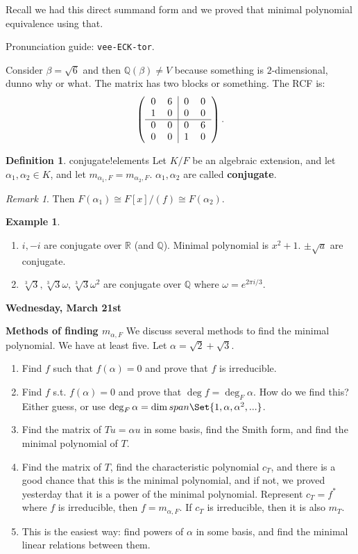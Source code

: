 \documentclass[9pt,reqno,twoside]{amsbook}
\theoremstyle{plain}
\numberwithin{section}{chapter}
\numberwithin{equation}{chapter}
\theoremstyle{definition}
\newtheorem{Def}[theorem]{Definition}
\newtheorem{Ex}[theorem]{Example}
\theoremstyle{remark}
\newtheorem{rem}[theorem]{Remark}
\theoremstyle{plain}
\newcommand{\R}{\mathbb{R}}
\newcommand{\Q}{\mathbb{Q}}
\newcommand{\bb}{\vspace{3mm}}
\newcommand{\lpar}{\left(}
\newcommand{\rpar}{\right)}
\begin{document}
Recall we had this direct summand form and we proved that minimal polynomial equivalence using that. 

Pronunciation guide:
\texttt{vee-ECK-tor}.

Consider $\beta = \sqrt{6}$ and then $\Q(\beta) \neq V$ because something is $2$-dimensional, dunno why or what. The matrix has two blocks or something. The RCF is:
$$
\lpar 
\begin{tabular}{cc|cc}
0 & 6 & 0 & 0\\
1 & 0 & 0 & 0\\
\hline
0 & 0 & 0 & 6\\
0 & 0 & 1 & 0
\end{tabular}
\rpar.
$$

\begin{Def}{conjugate!elements}
Let $K/F$ be an algebraic extension, and let $\alpha_1,\alpha_2 \in K$, and let $m_{\alpha_1,F} = m_{\alpha_2,F}$. $\alpha_1,\alpha_2$ are called \textbf{conjugate}. 
\end{Def}

\begin{rem}
Then $F(\alpha_1) \cong F[x]/(f) \cong F(\alpha_2)$. 
\end{rem}

\begin{Ex}

\begin{enumerate}
\item $i,-i$ are conjugate over $\R$ (and $\Q$). Minimal polynomial is $x^2 + 1$. 
$\pm \sqrt{a}$ are conjugate. 
\item $\sqrt[3]{3},\sqrt[3]{3}\omega,\sqrt[3]{3}\omega^2$ are conjugate over $\Q$ where $\omega = e^{2\pi i/3}$. 
\end{enumerate}
\end{Ex}



\textbf{Wednesday, March 21st}

\bb
\textbf{Methods of finding $m_{\alpha,F}$}
\bb
We discuss several methods to find the minimal polynomial. We have at least five. Let $\alpha = \sqrt{2} + \sqrt{3}$. 
\begin{enumerate}
\item Find $f$ such that $f(\alpha) = 0$ and prove that $f$ is irreducible. 
\item Find $f$ s.t. $f(\alpha) = 0$ and prove that $\deg f = \deg_F\alpha$. How do we find this? Either guess, or use $\deg_F\alpha = \dim span\Set{1,\alpha,\alpha^2,...}$. 
\item Find the matrix of $Tu = \alpha u$ in some basis, find the Smith form, and find the minimal polynomial of $T$. 
\item Find the matrix of $T$, find the characteristic polynomial $c_T$, and there is a good chance that this is the minimal polynomial, and if not, we proved yesterday that it is a power of the minimal polynomial. Represent $c_T = f^*$ where $f$ is irreducible, then $f = m_{\alpha,F}$. If $c_T$ is irreducible, then it is also $m_T$. 
\item This is the easiest way: find powers of $\alpha$ in some basis, and find the minimal linear relations between them. 
\end{enumerate}
\end{document}
